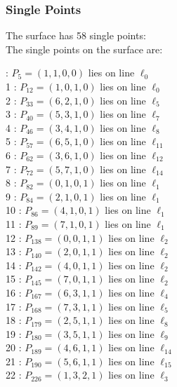 \documentclass{article}
\begin{document}
{\subsubsection*{Single Points}
The surface has 58 single points:\\
The single points on the surface are:\\
\begin{multicols}{2}
 : $P_{5}=( 1, 1, 0, 0 )$ lies on line $\ell_{0}$\\
1 : $P_{12}=( 1, 0, 1, 0 )$ lies on line $\ell_{0}$\\
2 : $P_{33}=( 6, 2, 1, 0 )$ lies on line $\ell_{5}$\\
3 : $P_{40}=( 5, 3, 1, 0 )$ lies on line $\ell_{7}$\\
4 : $P_{46}=( 3, 4, 1, 0 )$ lies on line $\ell_{8}$\\
5 : $P_{57}=( 6, 5, 1, 0 )$ lies on line $\ell_{11}$\\
6 : $P_{62}=( 3, 6, 1, 0 )$ lies on line $\ell_{12}$\\
7 : $P_{72}=( 5, 7, 1, 0 )$ lies on line $\ell_{14}$\\
8 : $P_{82}=( 0, 1, 0, 1 )$ lies on line $\ell_{1}$\\
9 : $P_{84}=( 2, 1, 0, 1 )$ lies on line $\ell_{1}$\\
10 : $P_{86}=( 4, 1, 0, 1 )$ lies on line $\ell_{1}$\\
11 : $P_{89}=( 7, 1, 0, 1 )$ lies on line $\ell_{1}$\\
12 : $P_{138}=( 0, 0, 1, 1 )$ lies on line $\ell_{2}$\\
13 : $P_{140}=( 2, 0, 1, 1 )$ lies on line $\ell_{2}$\\
14 : $P_{142}=( 4, 0, 1, 1 )$ lies on line $\ell_{2}$\\
15 : $P_{145}=( 7, 0, 1, 1 )$ lies on line $\ell_{2}$\\
16 : $P_{167}=( 6, 3, 1, 1 )$ lies on line $\ell_{4}$\\
17 : $P_{168}=( 7, 3, 1, 1 )$ lies on line $\ell_{5}$\\
18 : $P_{179}=( 2, 5, 1, 1 )$ lies on line $\ell_{8}$\\
19 : $P_{180}=( 3, 5, 1, 1 )$ lies on line $\ell_{9}$\\
20 : $P_{189}=( 4, 6, 1, 1 )$ lies on line $\ell_{14}$\\
21 : $P_{190}=( 5, 6, 1, 1 )$ lies on line $\ell_{15}$\\
22 : $P_{226}=( 1, 3, 2, 1 )$ lies on line $\ell_{3}$\\

\end{multicols}}
\end{document}
